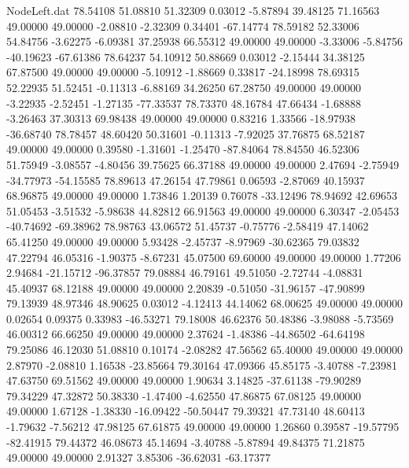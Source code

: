 \begin{filecontents}{NodeLeft.dat}
  78.54108   51.08810   51.32309     0.03012   -5.87894   39.48125   71.16563   49.00000   49.00000   -2.08810   -2.32309    0.34401  -67.14774
  78.59182   52.33006   54.84756    -3.62275   -6.09381   37.25938   66.55312   49.00000   49.00000   -3.33006   -5.84756  -40.19623  -67.61386
  78.64237   54.10912   50.88669     0.03012   -2.15444   34.38125   67.87500   49.00000   49.00000   -5.10912   -1.88669    0.33817  -24.18998
  78.69315   52.22935   51.52451    -0.11313   -6.88169   34.26250   67.28750   49.00000   49.00000   -3.22935   -2.52451   -1.27135  -77.33537
  78.73370   48.16784   47.66434    -1.68888   -3.26463   37.30313   69.98438   49.00000   49.00000    0.83216    1.33566  -18.97938  -36.68740
  78.78457   48.60420   50.31601    -0.11313   -7.92025   37.76875   68.52187   49.00000   49.00000    0.39580   -1.31601   -1.25470  -87.84064
  78.84550   46.52306   51.75949    -3.08557   -4.80456   39.75625   66.37188   49.00000   49.00000    2.47694   -2.75949  -34.77973  -54.15585
  78.89613   47.26154   47.79861     0.06593   -2.87069   40.15937   68.96875   49.00000   49.00000    1.73846    1.20139    0.76078  -33.12496
  78.94692   42.69653   51.05453    -3.51532   -5.98638   44.82812   66.91563   49.00000   49.00000    6.30347   -2.05453  -40.74692  -69.38962
  78.98763   43.06572   51.45737    -0.75776   -2.58419   47.14062   65.41250   49.00000   49.00000    5.93428   -2.45737   -8.97969  -30.62365
  79.03832   47.22794   46.05316    -1.90375   -8.67231   45.07500   69.60000   49.00000   49.00000    1.77206    2.94684  -21.15712  -96.37857
  79.08884   46.79161   49.51050    -2.72744   -4.08831   45.40937   68.12188   49.00000   49.00000    2.20839   -0.51050  -31.96157  -47.90899
  79.13939   48.97346   48.90625     0.03012   -4.12413   44.14062   68.00625   49.00000   49.00000    0.02654    0.09375    0.33983  -46.53271
  79.18008   46.62376   50.48386    -3.98088   -5.73569   46.00312   66.66250   49.00000   49.00000    2.37624   -1.48386  -44.86502  -64.64198
  79.25086   46.12030   51.08810     0.10174   -2.08282   47.56562   65.40000   49.00000   49.00000    2.87970   -2.08810    1.16538  -23.85664
  79.30164   47.09366   45.85175    -3.40788   -7.23981   47.63750   69.51562   49.00000   49.00000    1.90634    3.14825  -37.61138  -79.90289
  79.34229   47.32872   50.38330    -1.47400   -4.62550   47.86875   67.08125   49.00000   49.00000    1.67128   -1.38330  -16.09422  -50.50447
  79.39321   47.73140   48.60413    -1.79632   -7.56212   47.98125   67.61875   49.00000   49.00000    1.26860    0.39587  -19.57795  -82.41915
  79.44372   46.08673   45.14694    -3.40788   -5.87894   49.84375   71.21875   49.00000   49.00000    2.91327    3.85306  -36.62031  -63.17377

\end{filecontents}
